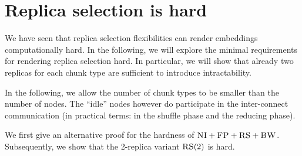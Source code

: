 \documentclass[conference,10pt]{IEEEtran}
\newcommand{\maciek}[1]{\textcolor{brown}{maciek: #1}}
\newcommand{\CC}{\textsc{NI}}
\newcommand{\FP}{\textsc{FP}}
\newcommand{\RS}{\textsc{RS}}
\newcommand{\BW}{\textsc{BW}}
\newcommand{\MA}{\textsc{MA}}
\begin{document}
\section{Replica selection is hard}\label{ap:tworep}

We have seen that replica selection flexibilities can render embeddings computationally hard.
In the following, we will explore the minimal requirements for rendering replica selection hard.
In particular, we will show that already two replicas for each chunk type are sufficient to
introduce intractability.

In the following, we allow the number of chunk types to be smaller than the number of nodes.
 The ``idle'' nodes however do participate in the inter-connect communication (in practical terms: in the shuffle phase
 and the reducing phase).



We first give an alternative proof for the hardness of $\CC+\FP+\RS+\BW$.
Subsequently, we show that the 2-replica variant $\RS(2)$ is hard.


\end{document}
